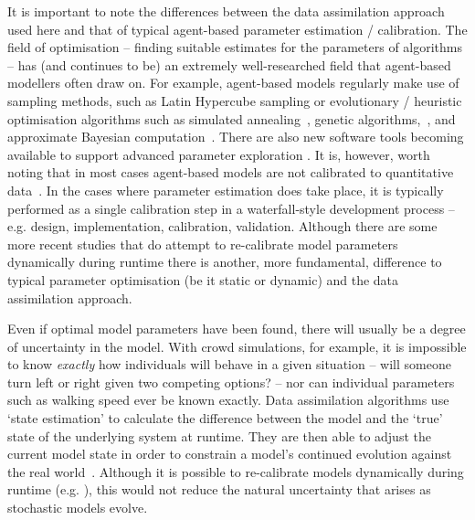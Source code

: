 It is important to note the differences between the data assimilation approach used here and that of typical agent-based parameter estimation / calibration. The field of optimisation -- finding suitable estimates for the parameters of algorithms -- has (and continues to be) an extremely well-researched field that agent-based modellers often draw on. For example, agent-based models regularly make use of sampling methods, such as Latin Hypercube sampling \citep{thiele_facilitating_2014} or evolutionary / heuristic optimisation algorithms such as simulated annealing~\citep{pennisi_optimal_2008}, genetic algorithms,~\citep{heppenstall_genetic_2007}, and approximate Bayesian computation~\citep{grazzini_bayesian_2017}. There are also new software tools becoming available to support advanced parameter exploration \citep{ozik_extremescale_2018}. It is, however, worth noting that in most cases agent-based models are not calibrated to quantitative data~\citep{thiele_facilitating_2014}.  In the cases where parameter estimation does take place, it is typically performed as a single calibration step in a waterfall-style development process -- e.g. design, implementation, calibration, validation. Although there are some more recent studies that do attempt to re-calibrate model parameters dynamically during runtime \citep[e.g.][]{oloo_adaptive_2017a, oloo_predicting_2018} there is another, more fundamental, difference to typical parameter optimisation (be it static or dynamic) and the data assimilation approach. 

Even if optimal model parameters have been found, there will usually be a degree of uncertainty in the model. With crowd simulations, for example, it is impossible to know \textit{exactly} how individuals will behave in a given situation -- will someone turn left or right given two competing options? -- nor can individual parameters such as walking speed ever be known exactly. Data assimilation algorithms use `state estimation' to calculate the difference between the model and the `true' state of the underlying system at runtime. They are then able to adjust the current model state in order to constrain a model's continued evolution against the real world~\citep{ward_dynamic_2016}. Although it is possible to re-calibrate models dynamically during runtime (e.g. \citep{oloo_adaptive_2017a}), this would not reduce the natural uncertainty that arises as stochastic models evolve. 

